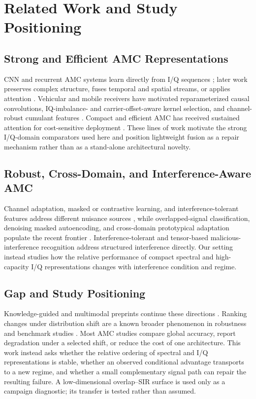 \documentclass[letterpaper,journal]{IEEEtran}
\begin{document}
\section{Related Work and Study Positioning}
\subsection{Strong and Efficient AMC Representations}
CNN and recurrent AMC systems learn directly from I/Q sequences
\cite{oshea2016cnn,meng2018amc,xu2020mcldnn}; later work preserves complex
structure, fuses temporal and spatial streams, or applies attention
\cite{tu2020complex,zhang2020dual,cai2022transformer,shao2025iqformer}.
Vehicular and mobile receivers have motivated reparameterized causal
convolutions, IQ-imbalance- and carrier-offset-aware kernel selection, and
channel-robust cumulant
features \cite{tang2024repccnet,ren2024crosssknet,huang2024csqcc}. Compact and
efficient AMC has received sustained attention for cost-sensitive deployment
\cite{wang2020lightamc,efficientamc2026tgcn}. These lines of work motivate the
strong I/Q-domain comparators used here and position lightweight fusion as a
repair mechanism rather than as a stand-alone architectural novelty.

\subsection{Robust, Cross-Domain, and Interference-Aware AMC}
Channel adaptation, masked or contrastive learning, and interference-tolerant
features address different nuisance sources
\cite{wang2024sigda,xiao2024mclhn,du2025contrastive,sun2025mfenet}, while
overlapped-signal classification, denoising masked autoencoding, and
cross-domain prototypical adaptation populate the recent frontier
\cite{jajoo2024overlapped,faysal2026denomae,li2026cgpcda}. Interference-tolerant
\cite{sun2025mfenet} and tensor-based malicious-interference
\cite{zhang2026malicious} recognition address structured interference
directly. Our setting instead studies how the relative performance of compact
spectral and high-capacity I/Q representations changes with interference
condition and regime.

\subsection{Gap and Study Positioning}
Knowledge-guided and multimodal preprints continue these directions
\cite{dkdnet2026preprint,moeformer2026preprint,zoomspec2026preprint,
rismae2025preprint}. Ranking changes under distribution shift are a known
broader phenomenon in robustness and benchmark studies
\cite{taori2020naturalshift,miller2021accuracyline,koh2021wilds}. Most AMC
studies compare global accuracy, report degradation under a selected shift, or
reduce the cost of one architecture. This work instead asks whether the
relative ordering of spectral and I/Q representations is stable, whether an
observed conditional advantage transports to a new regime, and whether a
small complementary signal path can repair the resulting failure. A
low-dimensional overlap--SIR surface is used only as a campaign diagnostic;
its transfer is tested rather than assumed.
\end{document}
